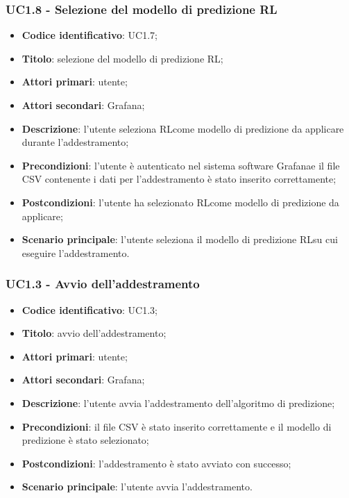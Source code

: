 \subsubsection{UC1.8 - Selezione del modello di predizione RL}
\begin{itemize}
	\item \textbf{Codice identificativo}: UC1.7;
	\item \textbf{Titolo}: selezione del modello di predizione RL\glo;
	\item \textbf{Attori primari}: utente;
	\item \textbf{Attori secondari}: Grafana\glo;
	\item \textbf{Descrizione}: l'utente seleziona RL\glosp come modello di predizione da applicare durante l'addestramento;
	\item \textbf{Precondizioni}: l'utente è autenticato nel sistema software Grafana\glosp e il file CSV contenente i dati per l'addestramento è stato inserito correttamente;
	\item \textbf{Postcondizioni}: l'utente ha selezionato RL\glosp come modello di predizione da applicare;
	\item \textbf{Scenario principale}: l'utente seleziona il modello di predizione RL\glosp su cui eseguire l'addestramento.
\end{itemize}

\subsubsection{UC1.3 - Avvio dell'addestramento}
\begin{itemize}
	\item \textbf{Codice identificativo}: UC1.3;
	\item \textbf{Titolo}: avvio dell'addestramento;
	\item \textbf{Attori primari}: utente;
	\item \textbf{Attori secondari}: Grafana\glo;
	\item \textbf{Descrizione}: l'utente avvia l'addestramento dell'algoritmo di predizione;
	\item \textbf{Precondizioni}: il file CSV è stato inserito correttamente e il modello di predizione è stato selezionato;
	\item \textbf{Postcondizioni}: l'addestramento è stato avviato con successo;
	\item \textbf{Scenario principale}: l'utente avvia l'addestramento.
\end{itemize}

